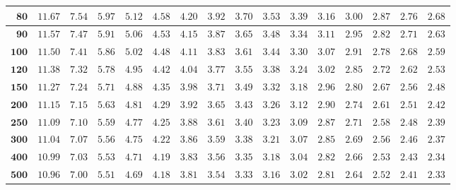 \begin{customTableWrapper}{1.4}
\begin{longtable}{|r|r|r|r|r|r|r|r|r|r|r|r|r|r|r|r|}
    ${\mathbf{80}}$  & ${11.67}$   & ${7.54}$   & ${5.97}$   & ${5.12}$   & ${4.58}$   & ${4.20}$   & ${3.92}$   & ${3.70}$   & ${3.53}$   & ${3.39}$   & ${3.16}$   & ${3.00}$   & ${2.87}$   & ${2.76}$   & ${2.68}$   \\ \hline 
    ${\mathbf{90}}$  & ${11.57}$   & ${7.47}$   & ${5.91}$   & ${5.06}$   & ${4.53}$   & ${4.15}$   & ${3.87}$   & ${3.65}$   & ${3.48}$   & ${3.34}$   & ${3.11}$   & ${2.95}$   & ${2.82}$   & ${2.71}$   & ${2.63}$   \\ \hline 
    ${\mathbf{100}}$  & ${11.50}$   & ${7.41}$   & ${5.86}$   & ${5.02}$   & ${4.48}$   & ${4.11}$   & ${3.83}$   & ${3.61}$   & ${3.44}$   & ${3.30}$   & ${3.07}$   & ${2.91}$   & ${2.78}$   & ${2.68}$   & ${2.59}$   \\ \hline 
    ${\mathbf{120}}$  & ${11.38}$   & ${7.32}$   & ${5.78}$   & ${4.95}$   & ${4.42}$   & ${4.04}$   & ${3.77}$   & ${3.55}$   & ${3.38}$   & ${3.24}$   & ${3.02}$   & ${2.85}$   & ${2.72}$   & ${2.62}$   & ${2.53}$   \\ \hline 
    ${\mathbf{150}}$  & ${11.27}$   & ${7.24}$   & ${5.71}$   & ${4.88}$   & ${4.35}$   & ${3.98}$   & ${3.71}$   & ${3.49}$   & ${3.32}$   & ${3.18}$   & ${2.96}$   & ${2.80}$   & ${2.67}$   & ${2.56}$   & ${2.48}$   \\ \hline 
    ${\mathbf{200}}$  & ${11.15}$   & ${7.15}$   & ${5.63}$   & ${4.81}$   & ${4.29}$   & ${3.92}$   & ${3.65}$   & ${3.43}$   & ${3.26}$   & ${3.12}$   & ${2.90}$   & ${2.74}$   & ${2.61}$   & ${2.51}$   & ${2.42}$   \\ \hline 
    ${\mathbf{250}}$  & ${11.09}$   & ${7.10}$   & ${5.59}$   & ${4.77}$   & ${4.25}$   & ${3.88}$   & ${3.61}$   & ${3.40}$   & ${3.23}$   & ${3.09}$   & ${2.87}$   & ${2.71}$   & ${2.58}$   & ${2.48}$   & ${2.39}$   \\ \hline 
    ${\mathbf{300}}$  & ${11.04}$   & ${7.07}$   & ${5.56}$   & ${4.75}$   & ${4.22}$   & ${3.86}$   & ${3.59}$   & ${3.38}$   & ${3.21}$   & ${3.07}$   & ${2.85}$   & ${2.69}$   & ${2.56}$   & ${2.46}$   & ${2.37}$   \\ \hline 
    ${\mathbf{400}}$  & ${10.99}$   & ${7.03}$   & ${5.53}$   & ${4.71}$   & ${4.19}$   & ${3.83}$   & ${3.56}$   & ${3.35}$   & ${3.18}$   & ${3.04}$   & ${2.82}$   & ${2.66}$   & ${2.53}$   & ${2.43}$   & ${2.34}$   \\ \hline 
    ${\mathbf{500}}$  & ${10.96}$   & ${7.00}$   & ${5.51}$   & ${4.69}$   & ${4.18}$   & ${3.81}$   & ${3.54}$   & ${3.33}$   & ${3.16}$   & ${3.02}$   & ${2.81}$   & ${2.64}$   & ${2.52}$   & ${2.41}$   & ${2.33}$   \\ \hline 

\end{longtable}
\end{customTableWrapper}

